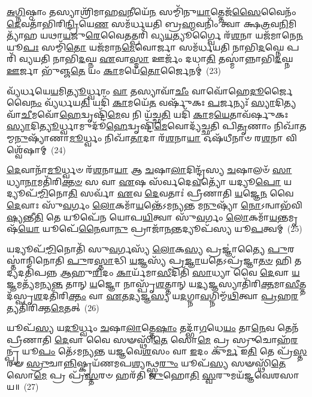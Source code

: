 \-\ul{𑌅}\-\-\ul{𑌗𑍍𑌨𑌿}\-𑌷𑍍𑌠𑌾𑌂 𑌤𑌸𑍍𑌯𑌾𑌶𑍍𑌰𑌿᳴𑌮𑌾𑌹\-\ul{𑌵}\-𑌨𑍀𑌯𑍇᳴\-\ul{𑌨} 𑌸𑌮𑍍𑌮𑌿᳴𑌨𑍁\-\ul{𑌯𑌾}\-𑌤𑍍𑌤𑍇𑌜᳴\-\ul{𑌸𑍈}\-𑌵𑍈𑌨𑌂᳴ \ul{𑌦𑍇}\-𑌵𑌤𑌾᳴𑌭𑌿𑌰𑌿\-\ul{𑌨𑍍𑌦𑍍𑌰𑌿}\-𑌯𑍇\-\ul{𑌣} 𑌸𑌮᳴𑌰𑍍𑌧𑌯𑌤𑌿 𑌬𑍍𑌰\-\ul{𑌹𑍍𑌮}\-𑌵𑌨𑌿𑌂᳴ 𑌤𑍍𑌵𑌾 𑌕𑍍𑌷\-\ul{𑌤𑍍𑌰}\-𑌵\-\ul{𑌨𑌿}\-𑌮𑌿𑌤𑍍𑌯𑌾᳴𑌹 𑌯𑌥𑌾\-\ul{𑌯}\-𑌜𑍁\-\ul{𑌰𑍇}\-𑌵𑍈𑌤𑌤𑍍𑌪𑌰𑌿᳴ 𑌵𑍍𑌯\-\ul{𑌯}\-𑌤𑍍𑌯𑍂𑌰𑍍𑌗𑍍𑌵𑍈 𑌰᳴\-\ul{𑌶}\-𑌨𑌾 𑌯𑌜᳴𑌮𑌾𑌨𑍇\-\ul{𑌨} 𑌯𑍂\-\ul{𑌪𑌃} 𑌸𑌮𑍍𑌮𑌿᳴\-\ul{𑌤𑍋} 𑌯𑌜᳴𑌮𑌾𑌨\-\ul{𑌮𑍇}\-𑌵𑍋𑌰𑍍𑌜𑌾 𑌸𑌮᳴𑌰𑍍𑌧𑌯𑌤𑌿 𑌨𑌾𑌭𑌿\-\ul{𑌦}\-𑌘𑍍𑌨𑍇 𑌪𑌰𑌿᳴ 𑌵𑍍𑌯𑌯𑌤𑌿 𑌨𑌾𑌭𑌿\-\ul{𑌦}\-𑌘𑍍𑌨 \ul{𑌏}\-𑌵𑌾\-\ul{𑌸𑍍𑌮𑌾} 𑌊𑌰𑍍𑌜𑌂᳴ 𑌦𑌧𑌾\-\ul{𑌤𑌿} 𑌤𑌸𑍍𑌮𑌾॑𑌨𑍍𑌨𑌾𑌭𑌿\-\ul{𑌦}\-𑌘𑍍𑌨 \ul{𑌊}\-𑌰𑍍𑌜𑌾 𑌭𑍁᳴𑌞𑍍𑌜\-\ul{𑌤𑍇} 𑌯𑌂 \ul{𑌕𑌾}\-𑌮𑌯𑍇᳴\-\ul{𑌤𑍋}\-𑌰𑍍𑌜𑍈𑌨𑌮𑍍॑~(23)

𑌵𑍍𑌯᳴𑌰𑍍𑌧𑌯𑍇\-\ul{𑌯}\-𑌮𑌿\-\ul{𑌤𑍍𑌯𑍂}\-𑌰𑍍𑌧𑍍𑌵𑌾𑌂 \ul{𑌵𑌾} 𑌤𑌸𑍍𑌯𑌾𑌵𑌾᳴\-\ul{𑌚𑍀𑌂} 𑌵𑌾𑌵𑍋᳴𑌹𑍇\-\ul{𑌦𑍂}\-𑌰𑍍𑌜𑍈𑌵𑍈\-\ul{𑌨𑌂} 𑌵𑍍𑌯᳴𑌰𑍍𑌧𑌯\-\ul{𑌤𑌿} 𑌯𑌦𑌿᳴ \ul{𑌕𑌾}\-𑌮𑌯𑍇᳴\-\ul{𑌤} 𑌵𑌰𑍍\mbox{}𑌷𑍁᳴𑌕𑌃 \ul{𑌪}\-𑌰𑍍𑌜𑌨𑍍𑌯𑌃᳴ \ul{𑌸𑍍𑌯𑌾}\-𑌦𑌿𑌤𑍍𑌯𑌵𑌾᳴\-\ul{𑌚𑍀}\-𑌮𑌵𑍋᳴\-\ul{𑌹𑍇}\-\-𑌦𑍍𑌵𑍃𑌷𑍍𑌟𑌿᳴\-\ul{𑌮𑍇}\-𑌵 𑌨𑌿 𑌯᳴𑌚𑍍𑌛\-\ul{𑌤𑌿} 𑌯𑌦𑌿᳴ \ul{𑌕𑌾}\-𑌮\-\ul{𑌯𑍇}\-𑌤𑌾𑌵᳴𑌰𑍍\mbox{}𑌷𑍁𑌕𑌃 \ul{𑌸𑍍𑌯𑌾}\-𑌦𑌿\-\ul{𑌤𑍍𑌯𑍂}\-𑌰𑍍𑌧𑍍𑌵𑌾𑌮𑍁𑌦𑍂᳴\-\ul{𑌹𑍇}\-𑌦𑍍𑌵𑍃𑌷𑍍𑌟𑌿᳴\-\ul{𑌮𑍇}\-𑌵𑍋𑌦𑍍𑌯᳴𑌚𑍍𑌛𑌤𑌿 𑌪𑌿\-\ul{𑌤𑍃}\-𑌣𑌾𑌂 𑌨𑌿𑌖𑌾᳴𑌤𑌮𑍍𑌮\-\ul{𑌨𑍁}\-𑌷𑍍𑌯𑌾᳴𑌣𑌾\-\ul{𑌮𑍂}\-𑌰𑍍𑌧𑍍𑌵𑌂 𑌨𑌿𑌖𑌾᳴\-\ul{𑌤𑌾}\-𑌦𑌾 𑌰᳴\-\ul{𑌶}\-𑌨𑌾\-\ul{𑌯𑌾} 𑌓𑌷᳴𑌧𑍀𑌨𑌾𑍞 𑌰\-\ul{𑌶}\-𑌨𑌾 𑌵𑌿𑌶𑍍𑌵𑍇᳴𑌷𑌾𑌮𑍍~(24)

\-\ul{𑌦𑍇}\-𑌵𑌾𑌨𑌾᳴\-\ul{𑌮𑍂}\-𑌰𑍍𑌧𑍍𑌵𑍞 𑌰᳴\-\ul{𑌶}\-𑌨𑌾\-\ul{𑌯𑌾} 𑌆 \ul{𑌚}\-𑌷𑌾\-\ul{𑌲𑌾}\-𑌦𑌿𑌨𑍍𑌦𑍍𑌰᳴𑌸𑍍𑌯 \ul{𑌚}\-𑌷𑌾𑌲𑍞᳴ \ul{𑌸𑌾}\-𑌧𑍍𑌯𑌾\-\ul{𑌨𑌾}\-𑌮𑌤𑌿᳴𑌰𑌿\-\ul{𑌕𑍍𑌤}\-\-\ul{𑍞} 𑌸 𑌵𑌾 \ul{𑌏}\-𑌷 𑌸᳴𑌰𑍍𑌵𑌦𑍇\-\ul{𑌵}\-𑌤𑍍𑌯𑍋᳴ 𑌯𑌦𑍍𑌯𑍂\-\ul{𑌪𑍋} 𑌯𑌦𑍍𑌯𑍂𑌪᳴\-\-\ul{𑌮𑍍𑌮𑌿}\-𑌨𑍋\-\ul{𑌤𑌿} 𑌸𑌰𑍍𑌵𑌾᳴ \ul{𑌏}\-𑌵 \ul{𑌦𑍇}\-𑌵𑌤𑌾𑌃॑ 𑌪𑍍𑌰𑍀𑌣𑌾𑌤𑌿 \ul{𑌯}\-𑌜𑍍𑌞𑍇\-\ul{𑌨} 𑌵𑍈 \ul{𑌦𑍇}\-𑌵𑌾𑌃 𑌸𑍁᳴\-\ul{𑌵}\-𑌰𑍍𑌗𑌂 \ul{𑌲𑍋}\-𑌕𑌮𑌾᳴\-\ul{𑌯}\-𑌨𑍍𑌤𑍇᳴\-𑌽𑌮𑌨𑍍𑌯𑌨𑍍𑌤 𑌮\-\ul{𑌨𑍁}\-𑌷𑍍𑌯𑌾᳴ \ul{𑌨𑍋}\-\-𑌽𑌨𑍍𑌵𑌾𑌭᳴𑌵𑌿\-\ul{𑌷𑍍𑌯}\-𑌨𑍍𑌤𑍀\-\ul{𑌤𑌿} 𑌤𑍇 𑌯𑍂𑌪𑍇᳴𑌨 𑌯𑍋𑌪\-\ul{𑌯𑌿}\-𑌤𑍍𑌵𑌾 𑌸𑍁᳴\-\ul{𑌵}\-𑌰𑍍𑌗𑌂 \ul{𑌲𑍋}\-𑌕𑌮𑌾᳴\-\ul{𑌯}\-𑌨𑍍𑌤𑌮𑍃𑌷᳴\-\ul{𑌯𑍋} 𑌯𑍂𑌪𑍇᳴\-\ul{𑌨𑍈}\-𑌵𑌾\-\ul{𑌨𑍁} 𑌪𑍍𑌰𑌾𑌜𑌾᳴\-\ul{𑌨}\-𑌨𑍍𑌤𑌦𑍍𑌯𑍂𑌪᳴𑌸𑍍𑌯 𑌯𑍂\-\ul{𑌪}\-𑌤𑍍𑌵𑌮𑍍~(25)

𑌯𑌦𑍍𑌯𑍂𑌪᳴\-\ul{𑌮𑍍𑌮𑌿}\-𑌨𑍋𑌤𑌿᳴ 𑌸𑍁\-\ul{𑌵}\-𑌰𑍍𑌗𑌸𑍍𑌯᳴ \ul{𑌲𑍋}\-𑌕\-\ul{𑌸𑍍𑌯} 𑌪𑍍𑌰𑌜𑍍𑌞𑌾॑𑌤𑍍𑌯𑍈 \ul{𑌪𑍁}\-𑌰𑌸𑍍𑌤𑌾॑𑌨𑍍𑌮𑌿𑌨𑍋𑌤𑌿 \ul{𑌪𑍁}\-𑌰\-\ul{𑌸𑍍𑌤𑌾}\-𑌦𑍍𑌧𑌿 \ul{𑌯}\-𑌜𑍍𑌞𑌸𑍍𑌯᳴ 𑌪𑍍𑌰\-\ul{𑌜𑍍𑌞𑌾}\-𑌯𑌤𑍇\-𑌽𑌪𑍍𑌰᳴𑌜𑍍𑌞𑌾\-\ul{𑌤}\-\-\ul{𑍞} 𑌹𑌿 𑌤𑌦𑍍𑌯𑌦𑌤𑌿᳴𑌪𑌨𑍍𑌨 \ul{𑌆}\-𑌹𑍁\-\ul{𑌰𑌿}\-𑌦𑌂 \ul{𑌕𑌾}\-𑌰𑍍𑌯᳴𑌮𑌾\-\ul{𑌸𑍀}\-𑌦𑌿𑌤𑌿᳴ \ul{𑌸𑌾}\-𑌧𑍍𑌯𑌾 𑌵𑍈 \ul{𑌦𑍇}\-𑌵𑌾 \ul{𑌯}\-𑌜𑍍𑌞𑌮𑌤𑍍𑌯᳴𑌮𑌨𑍍𑌯\-\ul{𑌨𑍍𑌤} 𑌤𑌾𑌨𑍍 \ul{𑌯}\-𑌜𑍍𑌞𑍋 𑌨𑌾𑌸𑍍𑌪𑍃᳴\-\ul{𑌶}\-𑌤𑍍𑌤𑌾𑌨𑍍 𑌯\-\ul{𑌦𑍍𑌯}\-𑌜𑍍𑌞𑌸𑍍𑌯𑌾𑌤𑌿᳴𑌰𑌿\-\ul{𑌕𑍍𑌤}\-𑌮𑌾\-\ul{𑌸𑍀}\-𑌤𑍍𑌤𑌦᳴𑌸𑍍𑌪𑍃\-\ul{𑌶}\-\-𑌦𑌤𑌿᳴𑌰𑌿\-\ul{𑌕𑍍𑌤𑌂} 𑌵𑌾 \ul{𑌏}\-𑌤\-\ul{𑌦𑍍𑌯}\-𑌜𑍍𑌞\-\ul{𑌸𑍍𑌯} 𑌯\-\ul{𑌦}\-𑌗𑍍𑌨𑌾\-\ul{𑌵}\-𑌗𑍍𑌨𑌿𑌮𑍍𑌮᳴\-\ul{𑌥𑌿}\-𑌤𑍍𑌵𑌾 \ul{𑌪𑍍𑌰}\-𑌹\-\ul{𑌰}\-𑌤𑍍𑌯𑌤𑌿᳴𑌰𑌿𑌕𑍍𑌤\-\ul{𑌮𑍇}\-𑌤𑌤𑍍~(26)

𑌯𑍂𑌪᳴\-\ul{𑌸𑍍𑌯} 𑌯\-\ul{𑌦𑍂}\-𑌰𑍍𑌧𑍍𑌵𑌂 \ul{𑌚}\-𑌷𑌾\-\ul{𑌲𑌾}\-𑌤𑍍𑌤𑍇\-\ul{𑌷𑌾𑌂} 𑌤𑌦𑍍𑌭𑌾᳴\-\ul{𑌗}\-𑌧𑍇\-\ul{𑌯𑌂} 𑌤𑌾\-\ul{𑌨𑍇}\-𑌵 𑌤𑍇𑌨᳴ 𑌪𑍍𑌰𑍀𑌣𑌾𑌤𑌿 \ul{𑌦𑍇}\-𑌵𑌾 𑌵𑍈 𑌸𑍟𑌸𑍍𑌥𑌿᳴\-\ul{𑌤𑍇} 𑌸𑍋\-\ul{𑌮𑍇} 𑌪𑍍𑌰 𑌸𑍍𑌰𑍁𑌚𑍋𑌹᳴\-\ul{𑌰}\-𑌨𑍍𑌪𑍍𑌰 𑌯𑍂\-\ul{𑌪𑌂} 𑌤𑍇᳴\-𑌽𑌮𑌨𑍍𑌯𑌨𑍍𑌤 𑌯𑌜𑍍𑌞𑌵𑍇\-\ul{𑌶}\-𑌸𑌂 𑌵𑌾 \ul{𑌇}\-𑌦𑌂 𑌕𑍁᳴\-\ul{𑌰𑍍𑌮} 𑌇\-\ul{𑌤𑌿} 𑌤𑍇 𑌪𑍍𑌰᳴\-\ul{𑌸𑍍𑌤}\-𑌰𑍟 \ul{𑌸𑍍𑌰𑍁}\-𑌚𑌾\-\ul{𑌨𑍍𑌨𑌿}\-𑌷𑍍𑌕𑍍𑌰𑌯᳴𑌣𑌮𑌪\-\ul{𑌶𑍍𑌯}\-𑌨𑍍𑌥𑍍𑌸𑍍𑌵\-\ul{𑌰𑍁𑌂} 𑌯𑍂𑌪᳴\-\ul{𑌸𑍍𑌯} 𑌸𑍟𑌸𑍍𑌥𑌿᳴\-\ul{𑌤𑍇} 𑌸𑍋\-\ul{𑌮𑍇} 𑌪𑍍𑌰 𑌪𑍍𑌰᳴\-\ul{𑌸𑍍𑌤}\-𑌰𑍞 𑌹𑌰᳴𑌤𑌿 \ul{𑌜𑍁}\-𑌹𑍋\-\ul{𑌤𑌿} \ul{𑌸𑍍𑌵}\-𑌰𑍁𑌮𑌯᳴𑌜𑍍𑌞𑌵𑍇𑌶𑌸𑌾𑌯॥~(27)

